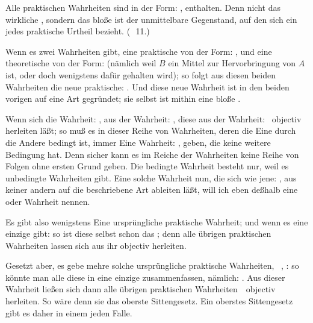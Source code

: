 \begin{aufza}
\begin{aufzb}
\item Alle praktischen Wahrheiten sind in der Form: , enthalten. Denn nicht das wirkliche , sondern das bloße
 ist der unmittelbare Gegenstand, auf den sich ein jedes praktische Urtheil bezieht. (\ \no\,11.)
\item Wenn es zwei Wahrheiten gibt, eine praktische von der Form: , und eine theoretische von der Form:  (nämlich weil $B$ ein Mittel zur Hervorbringung von $A$ ist, oder doch wenigstens dafür gehalten wird); so folgt aus diesen beiden Wahrheiten die neue praktische: . Und diese neue Wahrheit ist in den beiden vorigen auf eine  Art gegründet; sie selbst ist mithin eine bloße .
\item Wenn sich die Wahrheit: , aus der Wahrheit: , diese aus der Wahrheit:  \usw\ objectiv herleiten läßt; so muß es in dieser Reihe von Wahrheiten, deren die Eine durch die Andere bedingt ist, immer Eine Wahrheit: , geben, die keine weitere Bedingung hat. Denn sicher kann es im Reiche der Wahrheiten keine Reihe von Folgen ohne ersten Grund geben. Die bedingte Wahrheit besteht nur, weil es unbedingte Wahrheiten gibt. Eine solche Wahrheit nun, die sich wie jene: , aus keiner andern auf die beschriebene Art ableiten läßt, will ich eben deßhalb eine  oder  Wahrheit nennen.
\item Es gibt also wenigstens Eine ursprüngliche praktische Wahrheit; und wenn es  eine einzige gibt: so ist diese selbst schon das ; denn alle übrigen praktischen Wahrheiten lassen sich aus ihr objectiv herleiten.
\item Gesetzt aber, es gebe mehre solche ursprüngliche praktische Wahrheiten, \zB\ , \usw : so könnte man alle diese in eine einzige zusammenfassen, nämlich: . Aus dieser Wahrheit ließen sich dann alle übrigen praktischen Wahrheiten~\ objectiv herleiten. So wäre denn sie das oberste Sittengesetz. Ein oberstes Sittengesetz gibt es daher in einem jeden Falle.
\end{aufzb}
\end{aufza}


